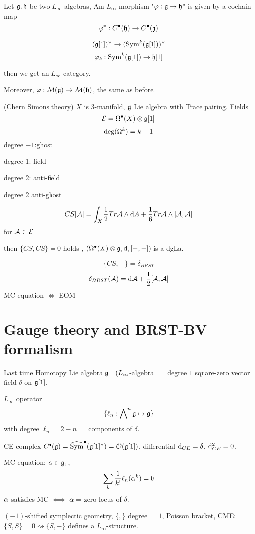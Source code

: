 \begin{definition}
Let $\mathfrak{g},\mathfrak{h}$ be two $L_\infty$-algebras,
Am $L_\infty$-morphism "$\varphi:\mathfrak{g}\to\mathfrak{h}$" is given by a cochain
map
$$\varphi^*:C^{\bullet}(\mathfrak{h})\to C^{\bullet}(\mathfrak{g})$$

$$(\mathfrak{g}[1])^\vee\to(\operatorname{Sym}^k(\mathfrak{g}[1]))^\vee$$
$$\varphi_k:\operatorname{Sym}^k(\mathfrak{g}[1])\to\mathfrak{h}[1]$$

\end{definition}

then we get an $L_\infty$ category.

Moreover, $\varphi:\mathcal{M}(\mathfrak{g})\to\mathcal{M}(\mathfrak{h})$,
the same as before.

\begin{example}(Chern Simons theory)
$X$ is 3-manifold, $\mathfrak{g}$ Lie algebra with Trace pairing.
Fields
$$\mathcal{E}=\Omega^{\bullet}(X)\otimes\mathfrak{g}[1]$$
$$\deg(\Omega^k)=k-1$$
degree $-1$:ghost

degree 1: field

degree 2: anti-field

degree 2 anti-ghost

$$CS[\mathcal{A}]=\int_X\frac{1}{2}Tr\mathcal{A}\wedge\mathrm{d} A+\frac{1}{6}Tr\mathcal{A}\wedge[\mathcal{A},\mathcal{A}]$$
for $\mathcal{A}\in\mathcal{E}$

then $\{CS,CS\}=0$ holds ,
$(\Omega^{\bullet}(X)\otimes\mathfrak{g},\mathrm{d},[-,-])$ is a dgLa.

$$\{CS,-\}=\delta_{BRST}$$
$$\delta_{BRST}(\mathcal{A})=\mathrm{d} \mathcal{A}+\frac{1}{2}[\mathcal{A},\mathcal{A}]$$
MC equation $\iff$ EOM
\end{example}



\section{Gauge theory and BRST-BV formalism}

Last time
Homotopy Lie algebra $\mathfrak{g}\quad(L_\infty$-algebra
$=$ degree $1$ square-zero vector field $\delta$ on $\mathfrak{g}[1]$.

$L_\infty$ operator
$$\{\ell_n:\bigwedge\nolimits^{n}\mathfrak{g}\mapsto \mathfrak{g}\}$$
with degree $\ell_n=2-n=$ components of $\delta$.

CE-complex $C^{\bullet} (\mathfrak{g})=\widehat{\operatorname{Sym}}^{\bullet}(\mathfrak{g}[1]^\wedge)=\mathcal{O}(\mathfrak{g}[1])$,
differential $\mathrm{d}_{CE}=\delta$.
$\mathrm{d}_{CE}^2=0$.

MC-equation: $\alpha\in\mathfrak{g}_1$,
$$\sum_{k}\frac{1}{k!}\ell_n(\alpha^k)=0$$
$\alpha$ satisfies MC $\iff\alpha=$ zero locus of $\delta$.

$(-1)$-shifted symplectic geometry, $\{,\}$ degree $=1$, Poisson bracket,
CME: $\{S,S\}=0\rightsquigarrow \{S,-\}$ defines a $L_\infty$-structure.
\vsp

